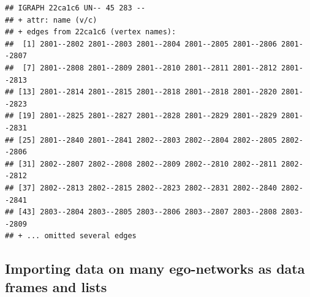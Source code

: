 \documentclass[
]{book}
\begin{document}
\begin{verbatim}
## IGRAPH 22ca1c6 UN-- 45 283 -- 
## + attr: name (v/c)
## + edges from 22ca1c6 (vertex names):
##  [1] 2801--2802 2801--2803 2801--2804 2801--2805 2801--2806 2801--2807
##  [7] 2801--2808 2801--2809 2801--2810 2801--2811 2801--2812 2801--2813
## [13] 2801--2814 2801--2815 2801--2818 2801--2818 2801--2820 2801--2823
## [19] 2801--2825 2801--2827 2801--2828 2801--2829 2801--2829 2801--2831
## [25] 2801--2840 2801--2841 2802--2803 2802--2804 2802--2805 2802--2806
## [31] 2802--2807 2802--2808 2802--2809 2802--2810 2802--2811 2802--2812
## [37] 2802--2813 2802--2815 2802--2823 2802--2831 2802--2840 2802--2841
## [43] 2803--2804 2803--2805 2803--2806 2803--2807 2803--2808 2803--2809
## + ... omitted several edges
\end{verbatim}

\hypertarget{importing-data-on-many-ego-networks-as-data-frames-and-lists}{%
\subsection{Importing data on many ego-networks as data frames and lists}\label{importing-data-on-many-ego-networks-as-data-frames-and-lists}}
\end{document}
